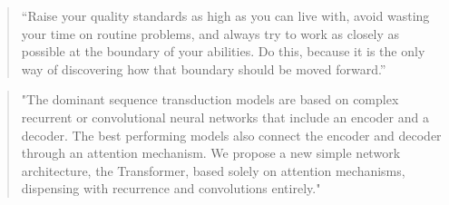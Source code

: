 \documentclass{article}
\begin{document}
\begin{quote}
    \centering
    “Raise your quality standards as high as you can live with, avoid wasting your time on routine problems, and always try to work as closely as possible at the boundary of your abilities. Do this, because it is the only way of discovering how that boundary should be moved forward.” \cite{dijkstra1982selected}
\end{quote}

\begin{quote}
    \centering
    "The dominant sequence transduction models are based on complex recurrent or convolutional neural networks that include an encoder and a decoder. The best performing models also connect the encoder and decoder through an attention mechanism. We propose a new simple network architecture, the Transformer, based solely on attention mechanisms, dispensing with recurrence and convolutions entirely." \cite{vaswani2017attention}
\end{quote}



\end{document}
